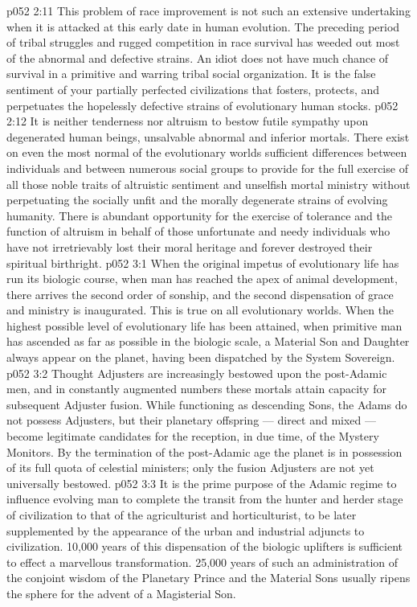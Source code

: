 \vs p052 2:11 This problem of race improvement is not such an extensive undertaking when it is attacked at this early date in human evolution. The preceding period of tribal struggles and rugged competition in race survival has weeded out most of the abnormal and defective strains. An idiot does not have much chance of survival in a primitive and warring tribal social organization. It is the false sentiment of your partially perfected civilizations that fosters, protects, and perpetuates the hopelessly defective strains of evolutionary human stocks.
\vs p052 2:12 It is neither tenderness nor altruism to bestow futile sympathy upon degenerated human beings, unsalvable abnormal and inferior mortals. There exist on even the most normal of the evolutionary worlds sufficient differences between individuals and between numerous social groups to provide for the full exercise of all those noble traits of altruistic sentiment and unselfish mortal ministry without perpetuating the socially unfit and the morally degenerate strains of evolving humanity. There is abundant opportunity for the exercise of tolerance and the function of altruism in behalf of those unfortunate and needy individuals who have not irretrievably lost their moral heritage and forever destroyed their spiritual birthright.
\vs p052 3:1 When the original impetus of evolutionary life has run its biologic course, when man has reached the apex of animal development, there arrives the second order of sonship, and the second dispensation of grace and ministry is inaugurated. This is true on all evolutionary worlds. When the highest possible level of evolutionary life has been attained, when primitive man has ascended as far as possible in the biologic scale, a Material Son and Daughter always appear on the planet, having been dispatched by the System Sovereign.
\vs p052 3:2 Thought Adjusters are increasingly bestowed upon the post\hyp{}Adamic men, and in constantly augmented numbers these mortals attain capacity for subsequent Adjuster fusion. While functioning as descending Sons, the Adams do not possess Adjusters, but their planetary offspring --- direct and mixed --- become legitimate candidates for the reception, in due time, of the Mystery Monitors. By the termination of the post\hyp{}Adamic age the planet is in possession of its full quota of celestial ministers; only the fusion Adjusters are not yet universally bestowed.
\vs p052 3:3 \pc It is the prime purpose of the Adamic regime to influence evolving man to complete the transit from the hunter and herder stage of civilization to that of the agriculturist and horticulturist, to be later supplemented by the appearance of the urban and industrial adjuncts to civilization. 10,000 years of this dispensation of the biologic uplifters is sufficient to effect a marvellous transformation. 25,000 years of such an administration of the conjoint wisdom of the Planetary Prince and the Material Sons usually ripens the sphere for the advent of a Magisterial Son.
